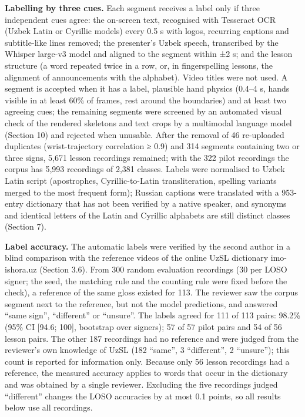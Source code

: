 \textbf{Labelling by three cues.} Each segment receives a label only if three independent cues agree: the on-screen text, recognised with Tesseract OCR \citep{2007_smith_tesseract} (Uzbek Latin or Cyrillic models) every 0.5 s with logos, recurring captions and subtitle-like lines removed; the presenter's Uzbek speech, transcribed by the Whisper large-v3 model \citep{2023_radford_whisper} and aligned to the segment within ±2 s; and the lesson structure (a word repeated twice in a row, or, in fingerspelling lessons, the alignment of announcements with the alphabet). Video titles were not used. A segment is accepted when it has a label, plausible hand physics (0.4--4 s, hands visible in at least 60\% of frames, rest around the boundaries) and at least two agreeing cues; the remaining segments were screened by an automated visual check of the rendered skeletons and text crops by a multimodal language model (Section 10) and rejected when unusable. After the removal of 46 re-uploaded duplicates (wrist-trajectory correlation ≥ 0.9) and 314 segments containing two or three signs, 5,671 lesson recordings remained; with the 322 pilot recordings the corpus has 5,993 recordings of 2,381 classes. Labels were normalised to Uzbek Latin script (apostrophes, Cyrillic-to-Latin transliteration, spelling variants merged to the most frequent form); Russian captions were translated with a 953-entry dictionary that has not been verified by a native speaker, and synonyms and identical letters of the Latin and Cyrillic alphabets are still distinct classes (Section 7).

\textbf{Label accuracy.} The automatic labels were verified by the second author in a blind comparison with the reference videos of the online UzSL dictionary imo-ishora.uz (Section 3.6). From 300 random evaluation recordings (30 per LOSO signer; the seed, the matching rule and the counting rule were fixed before the check), a reference of the same gloss existed for 113. The reviewer saw the corpus segment next to the reference, but not the model predictions, and answered ``same sign'', ``different'' or ``unsure''. The labels agreed for 111 of 113 pairs: 98.2\% (95\% CI {[}94.6; 100{]}, bootstrap over signers); 57 of 57 pilot pairs and 54 of 56 lesson pairs. The other 187 recordings had no reference and were judged from the reviewer's own knowledge of UzSL (182 ``same'', 3 ``different'', 2 ``unsure''); this count is reported for information only. Because only 56 lesson recordings had a reference, the measured accuracy applies to words that occur in the dictionary and was obtained by a single reviewer. Excluding the five recordings judged ``different'' changes the LOSO accuracies by at most 0.1 points, so all results below use all recordings.

